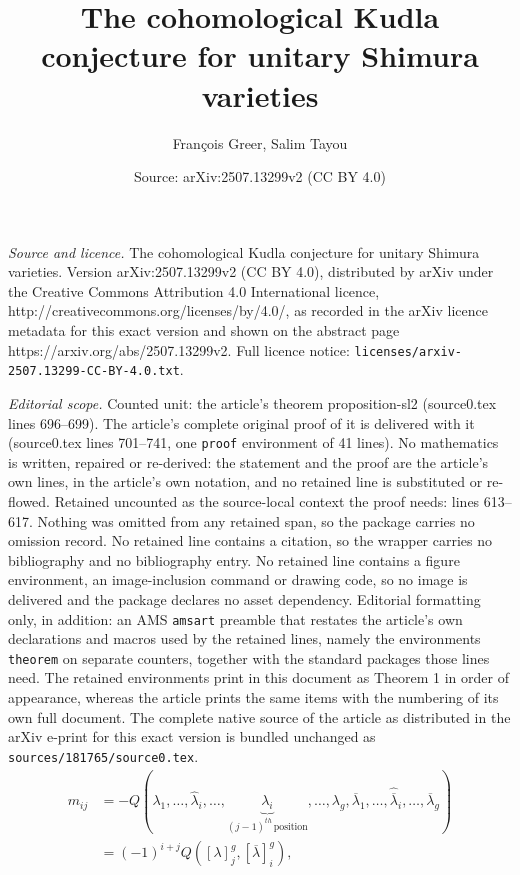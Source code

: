 \documentclass[10pt,a4paper]{amsart}
\title{The cohomological Kudla conjecture for unitary Shimura varieties}
\author{Fran\c{c}ois Greer, Salim Tayou}
\date{Source: arXiv:2507.13299v2 (CC BY 4.0)}
\begin{document}
\maketitle

\noindent\emph{Source and licence.} The cohomological Kudla conjecture for unitary Shimura varieties. Version arXiv:2507.13299v2 (CC BY 4.0), distributed by arXiv under the Creative Commons Attribution 4.0 International licence, http://creativecommons.org/licenses/by/4.0/, as recorded in the arXiv licence metadata for this exact version and shown on the abstract page https://arxiv.org/abs/2507.13299v2. Full licence notice: \texttt{licenses/arxiv-2507.13299-CC-BY-4.0.txt}.\par\smallskip

\noindent\textit{Editorial scope.} Counted unit: the article's theorem proposition-sl2 (source0.tex lines 696--699). The article's complete original proof of it is delivered with it (source0.tex lines 701--741, one \texttt{proof} environment of 41 lines). No mathematics is written, repaired or re-derived: the statement and the proof are the article's own lines, in the article's own notation, and no retained line is substituted or re-flowed.  Retained uncounted as the source-local context the proof needs: lines 613--617.  Nothing was omitted from any retained span, so the package carries no omission record.  No retained line contains a citation, so the wrapper carries no bibliography and no bibliography entry.  No retained line contains a figure environment, an image-inclusion command or drawing code, so no image is delivered and the package declares no asset dependency.  Editorial formatting only, in addition: an AMS \texttt{amsart} preamble that restates the article's own declarations and macros used by the retained lines, namely the environments \texttt{theorem} on separate counters, together with the standard packages those lines need.  The retained environments print in this document as Theorem 1 in order of appearance, whereas the article prints the same items with the numbering of its own full document.  The complete native source of the article as distributed in the arXiv e-print for this exact version is bundled unchanged as \texttt{sources/181765/source0.tex}.
\begin{align}\label{crucial}
   m_{ij}&=-Q(\lambda_1,\ldots,\widehat{\lambda}
   _i,\ldots,\underbrace{\lambda_i}_{(j-1)^{th}\, \textrm{position}},\ldots,\lambda_{g},\overline{\lambda}_1,\ldots,\widehat{\overline{\lambda}}_i,\ldots,\overline{\lambda}_{g})\\
   &=(-1)^{i+j}Q([\lambda]^g_j,[\overline{\lambda}]^g_i),
\end{align}
\end{document}
